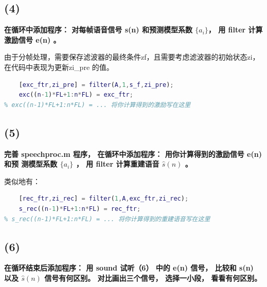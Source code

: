 \documentclass[10pt]{article}
\begin{document}
\subsection*{(4)}
\textbf{\color{gray}在循环中添加程序： 对每帧语音信号 s(n) 和预测模型系数 $\{a_i\} $， 用 filter 计算
激励信号 e(n) 。}

由于分帧处理，需要保存滤波器的最终条件zf，且需要考虑滤波器的初始状态zi，在代码中表现为更新zi\_pre
的值。
\begin{lstlisting}[language=matlab]
% (4) 在此位置写程序，用filter函数s_f计算激励，注意保持滤波器状态
    [exc_ftr,zi_pre] = filter(A,1,s_f,zi_pre);
    exc((n-1)*FL+1:n*FL) = exc_ftr;
% exc((n-1)*FL+1:n*FL) = ... 将你计算得到的激励写在这里
\end{lstlisting}
\subsection*{(5)}
\textbf{\color{gray}完善 speechproc.m 程序， 在循环中添加程序： 用你计算得到的激励信号 e(n) 和预
测模型系数 $\{a_i\} $ ， 用 filter 计算重建语音 $\hat{s}(n)$ 。}

类似地有：
\begin{lstlisting}[language=matlab]
% (5) 在此位置写程序，用filter函数和exc重建语音，注意保持滤波器状态
    [rec_ftr,zi_rec] = filter(1,A,exc_ftr,zi_rec);
    s_rec((n-1)*FL+1:n*FL) = rec_ftr;
% s_rec((n-1)*FL+1:n*FL) = ... 将你计算得到的重建语音写在这里
\end{lstlisting}

\subsection*{(6)}
\textbf{\color{gray}在循环结束后添加程序： 用 sound 试听（6） 中的 e(n) 信号， 比较和 s(n) 以及 $\hat{s}(n)$
信号有何区别。 对比画出三个信号， 选择一小段， 看看有何区别。}
\end{document}
